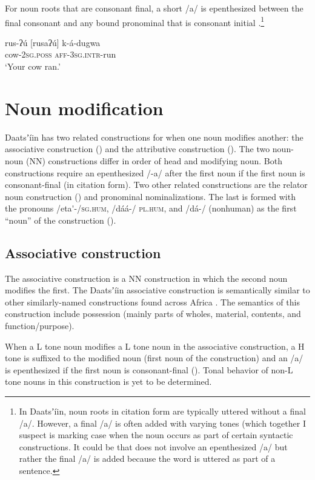 \documentclass[output=paper]{langsci/langscibook}
\begin{document}
For noun roots that are consonant final, a short /a/ is epenthesized between the final consonant and any bound pronominal that is consonant initial .\footnote{In Daatsʼíin, noun roots in citation form are typically uttered without a final /a/.  However, a final /a/ is often added with varying tones (which together I suspect is marking case when the noun occurs as part of certain syntactic constructions. It could be that  does not involve an epenthesized /a/ but rather the final /a/ is added because the word is uttered as part of a sentence. }

\ea\label{ex:ahlandc:49}
\gll
{rus-ʔ\'{u} [rusaʔ\'{u}]}     k-á-dugwa \\
cow-\textsc{2sg.poss}     \textsc{aff-3sg.intr}{}-run \\
\glt
‘Your cow ran.’
\z


\section{Noun modification}\label{sec:ahlandc:8}


Daatsʼíin has two related constructions for when one noun modifies another: the associative construction () and the attributive construction (). The two noun-noun (NN) constructions differ in order of head and modifying noun. Both constructions require an epenthesized /-a/ after the first noun if the first noun is consonant-final (in citation form). Two other related constructions are the relator noun construction () and pronominal nominalizations. The last is formed with the pronouns /eta\'{ }{}-/\textsc{sg.hum}, /dáá-/ \textsc{pl.hum}, and /dá-/ (nonhuman) as the first “noun” of the construction ().


\subsection{Associative construction}\label{sec:ahlandc:8.1}

The associative construction is a NN construction in which the second noun modifies the first. The Daatsʼíin associative construction is semantically similar to other similarly-named constructions found across Africa \citep[275-276]{Welmers1974}. The semantics of this construction include possession (mainly parts of wholes, material, contents, and function/purpose). 

When a L tone noun modifies a L tone noun in the associative construction, a H tone is suffixed to the modified noun (first noun of the construction) and an /a/ is epenthesized if the first noun is consonant-final (). Tonal behavior of non-L tone nouns in this construction is yet to be determined.
\end{document}
